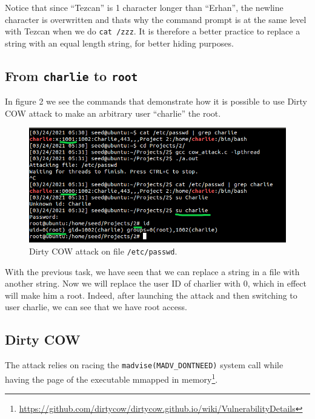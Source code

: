 \documentclass[12pt,reqno]{amsart}
\newcommand{\code}[1]{\texttt{#1}}
\begin{document}
Notice that since ``Tezcan'' is 1 character longer than ``Erhan'', the newline character is overwritten and thats why the command prompt is at the same level with Tezcan when we do \code{cat /zzz}. It is therefore a better practice to replace a string with an equal length string, for better hiding purposes.

\subsection{From \code{charlie} to \code{root}}

In figure 2 we see the commands that demonstrate how it is possible to use Dirty COW attack to make an arbitrary user ``charlie'' the root. 

\begin{figure}[h]
\label{fig:charlie}
\includegraphics[width=\linewidth]{part3.png}
\caption{Dirty COW attack on file \code{/etc/passwd}.}
\end{figure}

With the previous task, we have seen that we can replace a string in a file with another string. Now we will replace the user ID of charlier with 0, which in effect will make him a root. Indeed, after launching the attack and then switching to user charlie, we can see that we have root access.

\subsection{Dirty COW}
The attack relies on racing the \code{madvise(MADV\_DONTNEED)} system call while having the page of the executable mmapped in memory\footnote{\url{https://github.com/dirtycow/dirtycow.github.io/wiki/VulnerabilityDetails}}.
\end{document}
